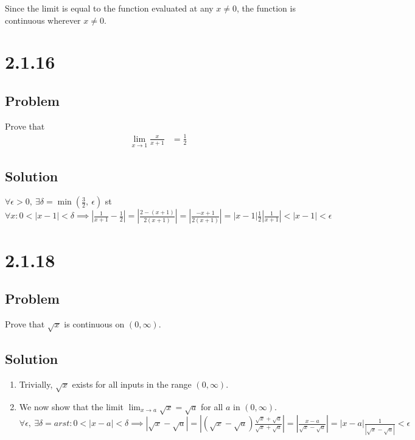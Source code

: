 \documentclass[12pt]{article}
\newcommand{\round}[1]{\left(       #1 \right)      }
\newcommand{\abs}  [1]{\left|       #1 \right|      }
\begin{document}
Since the limit is equal to the function evaluated at any $x \neq 0$, the function is continuous wherever $x \neq 0$.



\section*{2.1.16}

\subsection*{Problem}
Prove that
\begin{align*}
    \lim_{x \to 1} \frac{x}{x + 1} &= \frac{1}{2}
\end{align*}

\subsection*{Solution}
$\forall \epsilon > 0,\ \exists \delta = \min\round{\frac{3}{2},\ \epsilon}$ st $\forall x : 0 < \abs{x - 1} < \delta \implies \abs{\frac{1}{x + 1} - \frac{1}{2}} = \abs{\frac{2 - (x + 1)}{2(x + 1)}} = \abs{\frac{-x + 1}{2(x + 1)}} = \abs{x - 1} \frac{1}{2} \abs{\frac{1}{x + 1}} < \abs{x - 1} < \epsilon$



\section*{2.1.18}

\subsection*{Problem}
Prove that $\sqrt{x}$ is continuous on $(0, \infty)$.

\subsection*{Solution}
\begin{enumerate}
    \item Trivially, $\sqrt{x}$ exists for all inputs in the range $(0, \infty)$.
    \item We now show that the limit $\lim_{x \to a} \sqrt{x} = \sqrt{a}$ for all $a$ in $(0, \infty)$. $\forall \epsilon,\ \exists \delta = arst : 0 < \abs{x - a} < \delta \implies \abs{\sqrt{x} - \sqrt{a}} = \abs{\round{\sqrt{x} - \sqrt{a}} \frac{\sqrt{x} + \sqrt{a}}{\sqrt{x} + \sqrt{a}}} = \abs{\frac{x - a}{\sqrt{x} - \sqrt{a}}} = \abs{x - a} \frac{1}{\abs{\sqrt{x} - \sqrt{a}}} < \epsilon$
\end{enumerate}
\end{document}
